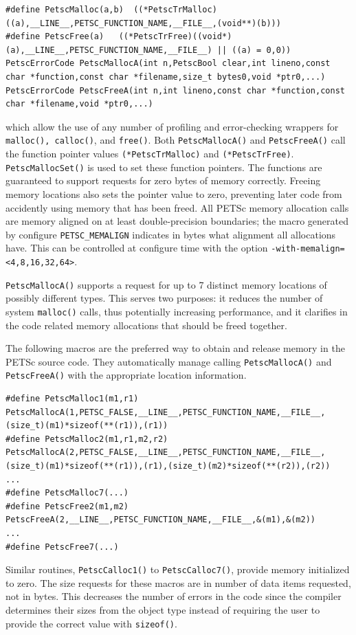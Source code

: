 \begin{lstlisting}
#define PetscMalloc(a,b)  ((*PetscTrMalloc)((a),__LINE__,PETSC_FUNCTION_NAME,__FILE__,(void**)(b)))
#define PetscFree(a)   ((*PetscTrFree)((void*)(a),__LINE__,PETSC_FUNCTION_NAME,__FILE__) || ((a) = 0,0))
PetscErrorCode PetscMallocA(int n,PetscBool clear,int lineno,const char *function,const char *filename,size_t bytes0,void *ptr0,...)
PetscErrorCode PetscFreeA(int n,int lineno,const char *function,const char *filename,void *ptr0,...)
\end{lstlisting}
which allow the use of any number of profiling and error-checking wrappers for \lstinline{malloc(), calloc()}, and \lstinline{free()}.
Both \lstinline{PetscMallocA()} and \lstinline{PetscFreeA()} call the function pointer values  \lstinline{(*PetscTrMalloc)} and \lstinline{(*PetscTrFree)}.
\lstinline{PetscMallocSet()} is used to set these function pointers.
The functions are guaranteed to support requests for zero bytes of
memory correctly. Freeing memory locations also sets the pointer value
to zero, preventing later code from accidently using memory that has
been freed. All PETSc memory allocation calls are memory aligned on at
least double-precision boundaries; the macro generated by
configure \lstinline{PETSC_MEMALIGN} indicates in bytes what alignment
all allocations have. This can be controlled at configure time with
the option \lstinline{-with-memalign=<4,8,16,32,64>}.


\lstinline{PetscMallocA()} supports a request for up to 7 distinct memory locations of possibly different types. This serves two purposes:
it reduces the number of system  \lstinline{malloc()} calls, thus potentially increasing performance, and it clarifies in the
code related memory allocations that should be freed together.

The following macros are the preferred way to obtain and release
memory in the PETSc source code. They automatically manage
calling \lstinline{PetscMallocA()} and \lstinline{PetscFreeA()} with
the appropriate location information.
\begin{lstlisting}
#define PetscMalloc1(m1,r1) PetscMallocA(1,PETSC_FALSE,__LINE__,PETSC_FUNCTION_NAME,__FILE__, (size_t)(m1)*sizeof(**(r1)),(r1))
#define PetscMalloc2(m1,r1,m2,r2) PetscMallocA(2,PETSC_FALSE,__LINE__,PETSC_FUNCTION_NAME,__FILE__, (size_t)(m1)*sizeof(**(r1)),(r1),(size_t)(m2)*sizeof(**(r2)),(r2))
...
#define PetscMalloc7(...)
#define PetscFree2(m1,m2)   PetscFreeA(2,__LINE__,PETSC_FUNCTION_NAME,__FILE__,&(m1),&(m2))
...
#define PetscFree7(...)
\end{lstlisting}
Similar routines, \lstinline{PetscCalloc1()}
to \lstinline{PetscCalloc7()}, provide memory initialized to
zero. The size requests for these macros are in number of data items
requested, not in bytes. This decreases the number of errors in the
code since the compiler determines their sizes from the object type 
instead of requiring the user to provide the correct value with \lstinline{sizeof()}.

